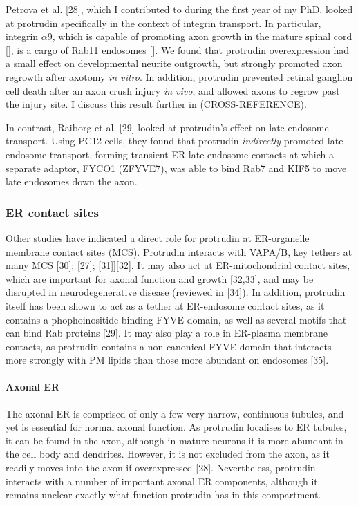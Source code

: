 \documentclass[
  12pt,
  a4paper,
]{book}
\begin{document}
Petrova et al. {[}28{]}, which I contributed to during the first year of my PhD, looked at protrudin specifically in the context of integrin transport. In particular, integrin \(\alpha9\), which is capable of promoting axon growth in the mature spinal cord {[}{]}, is a cargo of Rab11 endosomes {[}{]}. We found that protrudin overexpression had a small effect on developmental neurite outgrowth, but strongly promoted axon regrowth after axotomy \emph{in vitro}. In addition, protrudin prevented retinal ganglion cell death after an axon crush injury \emph{in vivo}, and allowed axons to regrow past the injury site. I discuss this result further in (CROSS-REFERENCE).

In contrast, Raiborg et al. {[}29{]} looked at protrudin's effect on late endosome transport. Using PC12 cells, they found that protrudin \emph{indirectly} promoted late endosome transport, forming transient ER-late endosome contacts at which a separate adaptor, FYCO1 (ZFYVE7), was able to bind Rab7 and KIF5 to move late endosomes down the axon.

\hypertarget{er-contact-sites}{%
\subsubsection{ER contact sites}\label{er-contact-sites}}

Other studies have indicated a direct role for protrudin at ER-organelle membrane contact sites (MCS). Protrudin interacts with VAPA/B, key tethers at many MCS {[}30{]}; {[}27{]}; {[}31{]}{]}{[}32{]}. It may also act at ER-mitochondrial contact sites, which are important for axonal function and growth {[}32,33{]}, and may be disrupted in neurodegenerative disease (reviewed in {[}34{]}). In addition, protrudin itself has been shown to act as a tether at ER-endosome contact sites, as it contains a phophoinositide-binding FYVE domain, as well as several motifs that can bind Rab proteins {[}29{]}. It may also play a role in ER-plasma membrane contacts, as protrudin contains a non-canonical FYVE domain that interacts more strongly with PM lipids than those more abundant on endosomes {[}35{]}.

\hypertarget{axonal-er}{%
\paragraph{Axonal ER}\label{axonal-er}}

The axonal ER is comprised of only a few very narrow, continuous tubules, and yet is essential for normal axonal function. As protrudin localises to ER tubules, it can be found in the axon, although in mature neurons it is more abundant in the cell body and dendrites. However, it is not excluded from the axon, as it readily moves into the axon if overexpressed {[}28{]}. Nevertheless, protrudin interacts with a number of important axonal ER components, although it remains unclear exactly what function protrudin has in this compartment.
\end{document}
